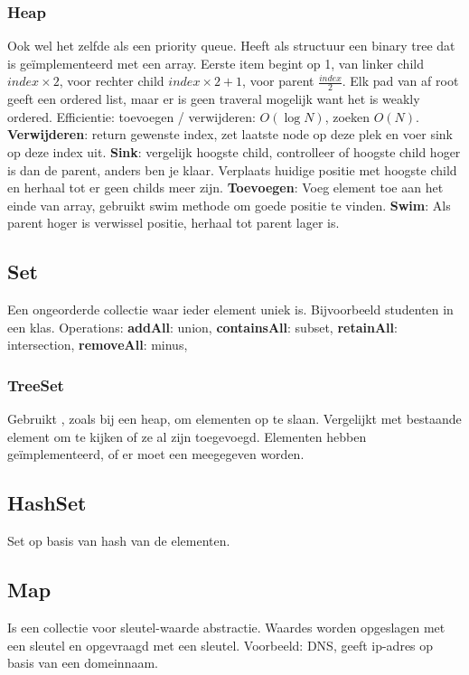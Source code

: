 \subsubsection{Heap}
Ook wel het zelfde als een priority queue.
Heeft als structuur een binary tree dat is geïmplementeerd met een array.
Eerste item begint op 1, van linker child $index \times 2$, voor rechter child $index \times 2 + 1$, voor parent $\frac{index}{2}$.
Elk pad van af root geeft een ordered list, maar er is geen traveral mogelijk want het is weakly ordered.
Efficientie: toevoegen / verwijderen: $O(\log N)$, zoeken $O(N)$.
\textbf{Verwijderen}: return gewenste index, zet laatste node op deze plek en voer sink op deze index uit.
\textbf{Sink}: vergelijk hoogste child, controlleer of hoogste child hoger is dan de parent, anders ben je klaar.
Verplaats huidige positie met hoogste child en herhaal tot er geen childs meer zijn.
\textbf{Toevoegen}: Voeg element toe aan het einde van array, gebruikt swim methode om goede positie te vinden.
\textbf{Swim}: Als parent hoger is verwissel positie, herhaal tot parent lager is.

\subsection{Set}
Een ongeorderde collectie waar ieder element uniek is.
Bijvoorbeeld studenten in een klas.
Operations:
\textbf{addAll}: union,
\textbf{containsAll}: subset,
\textbf{retainAll}: intersection,
\textbf{removeAll}: minus,

\subsubsection{TreeSet}
Gebruikt , zoals bij een heap, om elementen op te slaan.
Vergelijkt met bestaande element om te kijken of ze al zijn toegevoegd.
Elementen hebben  geïmplementeerd, of er moet een  meegegeven worden.

\subsection{HashSet}
Set op basis van hash van de elementen. 

\subsection{Map}
Is een collectie voor sleutel-waarde abstractie.
Waardes worden opgeslagen met een sleutel en opgevraagd met een sleutel.
Voorbeeld: DNS, geeft ip-adres op basis van een domeinnaam.

